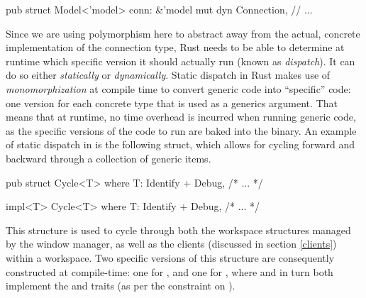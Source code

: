 \begin{rustblock}
  pub struct Model<'model> {
    conn: &'model mut dyn Connection,
    // ...
  }
\end{rustblock}


Since we are using polymorphism here to abstract away from the actual,
concrete implementation of the connection type, Rust needs to be able to
determine at runtime which specific version it should actually run (known as
\textit{dispatch})\cite{therustbook, rustblogtraits}. It can do so either
\textit{statically} or \textit{dynamically}. Static dispatch in Rust makes
use of \textit{monomorphization} at compile time to convert generic code into
``specific'' code: one version for each concrete type that is used as a generics
argument\cite{therustbook, rustblogtraits}. That means that at runtime, no time
overhead is incurred when running generic code, as the specific versions of the
code to run are baked into the binary\cite{therustbook, rustblogtraits}. An
example of static dispatch in \wmrs is the following  struct, which
allows for cycling forward and backward through a collection of generic items.

\begin{rustblock}
  pub struct Cycle<T>
  where
    T: Identify + Debug,
  { /* ... */ }
\end{rustblock}
\begin{rustblock}
  impl<T> Cycle<T>
  where
      T: Identify + Debug,
  { /* ... */ }
\end{rustblock}

This structure is used to cycle through both the workspace structures managed by
the window manager, as well as the clients (discussed in section \ref{clients})
within a workspace. Two specific versions of this structure are consequently
constructed at compile-time: one for , and one for
, where  and  in turn both
implement the  and  traits (as per the constraint on
).


